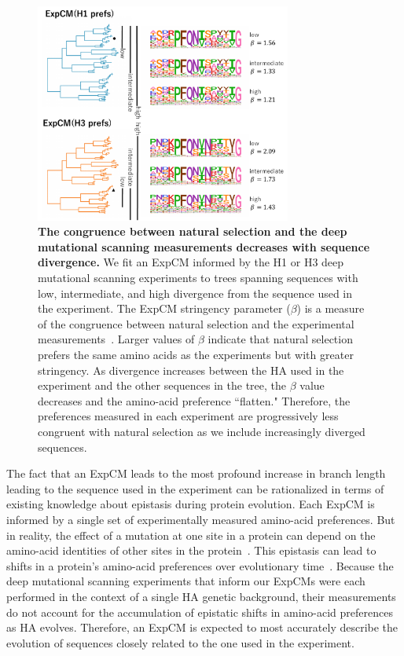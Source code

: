 \documentclass[11pt]{article}
\begin{document}
\begin{figure}
\centerline{\includegraphics[width=0.75\textwidth]{figures/compete}}
\caption{\label{fig:compete}
\textbf{The congruence between natural selection and the deep mutational scanning measurements decreases with sequence divergence.} 
We fit an ExpCM informed by the H1 or H3 deep mutational scanning experiments to trees spanning sequences with low, intermediate, and high divergence from the sequence used in the experiment. 
The ExpCM stringency parameter ($\beta$) is a measure of the congruence between natural selection and the experimental measurements~\citep{bloom2014informed,hilton2017phydms}. 
Larger values of $\beta$ indicate that natural selection prefers the same amino acids as the experiments but with greater stringency. 
As divergence increases between the HA used in the experiment and the other sequences in the tree, the $\beta$ value decreases and the amino-acid preference ``flatten."
Therefore, the preferences measured in each experiment are progressively less congruent with natural selection as we include increasingly diverged sequences. 
}
\end{figure}

The fact that an ExpCM leads to the most profound increase in branch length leading to the sequence used in the experiment can be rationalized in terms of existing knowledge about epistasis during protein evolution.
Each ExpCM is informed by a single set of experimentally measured amino-acid preferences.
But in reality, the effect of a mutation at one site in a protein can depend on the amino-acid identities of other sites in the protein~\citep{ortlund2007crystal, gong2013stability, harms2014historical, tufts2014epistasis, starr2018pervasive}. 
This epistasis can lead to shifts in a protein's amino-acid preferences over evolutionary time~\citep{pollock2012amino, doud2015site, shah2015contingency, bazykin2015changing, haddox2018mapping}.
Because the deep mutational scanning experiments that inform our ExpCMs were each performed in the context of a single HA genetic background, their measurements do not account for the accumulation of epistatic shifts in amino-acid preferences as HA evolves. 
Therefore, an ExpCM is expected to most accurately describe the evolution of sequences closely related to the one used in the experiment.
 
\end{document}
